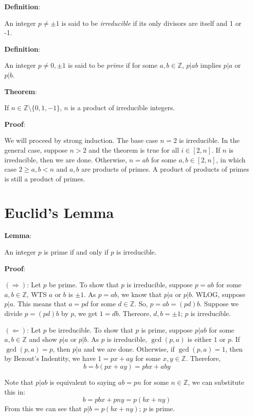 \documentclass{article}
\begin{document}
\begin{multicols*}{2}
\textbf{Definition}:

An integer $p \neq \pm 1$ is said to be \textit{irreducible} if its only divisors are itself and 1 or -1.

\textbf{Definition}:

An integer $p \neq 0, \pm 1$ is said to be \textit{prime} if for some $a, b \in \mathbb{Z}$, $p|ab$ implies $p|a$ or $p|b$.

\textbf{Theorem}:

If $n \in \mathbb{Z}\setminus\{0,1,-1\}$, $n$ is a product of irreducible integers.

\textbf{Proof}:

We will proceed by strong induction. The base case $n=2$ is irreducible. In the general case, suppose $n > 2$ and the theorem is true for all $i \in [2, n]$. If $n$ is irreducible, then we are done. Otherwise, $n = ab$ for some $a, b \in [2, n]$, in which case $2 \geq a, b < n$ and $a, b$ are products of primes. A product of products of primes is still a product of primes.

\section{Euclid's Lemma}

\textbf{Lemma}:

An integer $p$ is prime if and only if $p$ is irreducible.

\textbf{Proof}:

$(\Rightarrow)$: Let $p$ be prime. To show that $p$ is irreducible, suppose $p = ab$ for some $a, b \in \mathbb{Z}$, WTS $a$ or $b$ is $\pm 1$. As $p = ab$, we know that $p|a$ or $p|b$. WLOG, suppose $p|a$. This means that $a = pd$ for some $d \in \mathbb{Z}$. So, $p = ab = (pd)b$. Suppose we divide $p = (pd)b$ by $p$, we get $1 = db$. Thereore, $d, b = \pm 1$; $p$ is irreducible.

$(\Leftarrow)$: Let $p$ be irreducible. To show that $p$ is prime, suppose $p|ab$ for some $a, b \in \mathbb{Z}$ and show $p | a$ or $p | b$. As $p$ is irreducible, $\gcd(p, a)$ is either $1$ or $p$. If $\gcd(p, a) = p$, then $p|a$ and we are done. Otherwise, if $\gcd(p, a) = 1$, then by Bezout's Indentity, we have $1 = px + ay$ for some $x, y \in \mathbb{Z}$. Therefore, \[b = b(px+ay) = pbx + aby\]

Note that $p|ab$ is equivalent to saying $ab = pn$ for some $n \in \mathbb{Z}$, we can substitute this in:\[b = pbx + pny=p(bx+ny)\] From this we can see that $p|b=p(bx+ny)$; $p$ is prime.



\end{multicols*}
\end{document}
